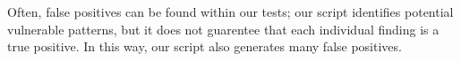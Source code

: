 Often, false positives can be found within our tests; our script 
identifies potential vulnerable patterns, but it does not guarentee
that each individual finding is a true positive. In this way, our script also generates
many false positives.




